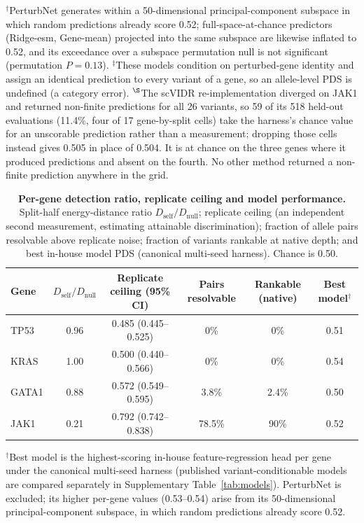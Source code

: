 \documentclass[11pt,letterpaper]{article}
\begin{document}
\begin{table}[H]
\smallskip
\footnotesize $^{\dagger}$PerturbNet generates within a 50-dimensional principal-component subspace in which random predictions already score 0.52; full-space-at-chance predictors (Ridge-esm, Gene-mean) projected into the same subspace are likewise inflated to 0.52, and its exceedance over a subspace permutation null is not significant (permutation $P=0.13$). $^{\ddagger}$These models condition on perturbed-gene identity and assign an identical prediction to every variant of a gene, so an allele-level PDS is undefined (a category error). $^{\S}$The scVIDR re-implementation diverged on JAK1 and returned non-finite predictions for all 26 variants, so 59 of its 518 held-out evaluations (11.4\%, four of 17 gene-by-split cells) take the harness's chance value for an unscorable prediction rather than a measurement; dropping those cells instead gives 0.505 in place of 0.504. It is at chance on the three genes where it produced predictions and absent on the fourth. No other method returned a non-finite prediction anywhere in the grid.
\end{table}

\begin{table}[H]
\centering
\caption{\textbf{Per-gene detection ratio, replicate ceiling and model performance.} Split-half energy-distance ratio $D_\mathrm{self}/D_\mathrm{null}$; replicate ceiling (an independent second measurement, estimating attainable discrimination); fraction of allele pairs resolvable above replicate noise; fraction of variants rankable at native depth; and best in-house model PDS (canonical multi-seed harness). Chance is 0.50.}
\label{tab:window}
\small
\begin{tabular}{@{}l c c c c c@{}}
\toprule
Gene & $D_\mathrm{self}/D_\mathrm{null}$ & Replicate ceiling (95\% CI) & Pairs resolvable & Rankable (native) & Best model$^{\dagger}$ \\
\midrule
TP53  & 0.96 & 0.485 (0.445--0.525) & 0\%    & 0\%   & 0.51 \\
KRAS  & 1.00 & 0.500 (0.440--0.566) & 0\%    & 0\%   & 0.54 \\
GATA1 & 0.88 & 0.572 (0.549--0.595) & 3.8\%  & 2.4\% & 0.50 \\
JAK1  & 0.21 & 0.792 (0.742--0.838) & 78.5\% & 90\%  & 0.52 \\
\bottomrule
\end{tabular}

\smallskip
\footnotesize $^{\dagger}$Best model is the highest-scoring in-house feature-regression head per gene under the canonical multi-seed harness (published variant-conditionable models are compared separately in Supplementary Table~\ref{tab:models}). PerturbNet is excluded; its higher per-gene values (0.53--0.54) arise from its 50-dimensional principal-component subspace, in which random predictions already score 0.52.
\end{table}
\end{document}
